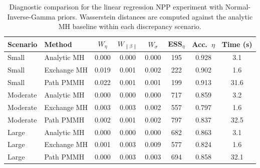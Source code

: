 \begin{table}[ht]
  \centering
  \begin{tabular}{llcccccc}
  \hline
  Scenario & Method & $W_\eta$ & $W_{\|\beta\|}$ & $W_\sigma$ & ESS$_\eta$ & Acc.\ $\eta$ & Time (s) \\
  \hline
  Small & Analytic MH & 0.000 & 0.000 & 0.000 & 195 & 0.928 & 3.1 \\
  Small & Exchange MH & 0.019 & 0.001 & 0.002 & 222 & 0.902 & 1.6 \\
  Small & Path PMMH & 0.022 & 0.001 & 0.001 & 199 & 0.913 & 31.6 \\
  \hline
  Moderate & Analytic MH & 0.000 & 0.000 & 0.000 & 717 & 0.859 & 3.2 \\
  Moderate & Exchange MH & 0.003 & 0.003 & 0.002 & 557 & 0.797 & 1.6 \\
  Moderate & Path PMMH & 0.002 & 0.001 & 0.002 & 797 & 0.837 & 32.5 \\
  \hline
  Large & Analytic MH & 0.000 & 0.000 & 0.000 & 682 & 0.863 & 3.1 \\
  Large & Exchange MH & 0.001 & 0.003 & 0.009 & 577 & 0.824 & 1.6 \\
  Large & Path PMMH & 0.000 & 0.003 & 0.003 & 694 & 0.858 & 32.1 \\
  \hline
  \end{tabular}
  \caption{Diagnostic comparison for the linear regression NPP experiment with Normal-Inverse-Gamma priors. Wasserstein distances are computed against the analytic MH baseline within each discrepancy scenario.}
  \label{tab:nig-lm-exchange-diagnostics}
\end{table}

